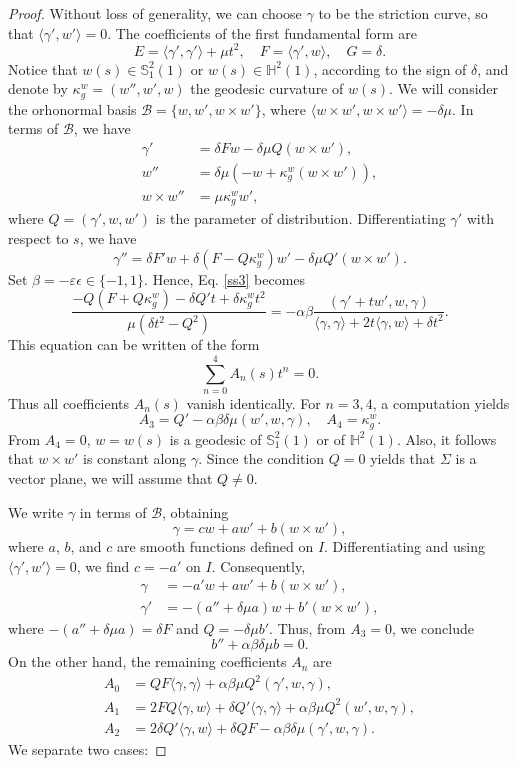 \documentclass[10pt,a4paper]{amsart}
\def\h{\mathbb H}
\def\s{\mathbb S}
\begin{document}
\begin{proof}
Without loss of generality, we can choose $\gamma$ to be the striction curve, so that $ \langle \gamma',w'\rangle=0$. The coefficients of  the first fundamental form are
$$
E=\langle \gamma',\gamma' \rangle +\mu t^2, \quad F=\langle \gamma',w\rangle, \quad G=\delta.
$$ 
Notice that $w(s)\in \s_1^2(1)$ or $w(s)\in \h^2(1)$, according to the sign of $\delta$, and denote by $\kappa_g^w=(w'',w',w)$ the geodesic curvature of $w(s)$. We will consider the orhonormal basis $\mathcal{B}=\{w,w',w\times w' \}$, where $\langle w\times w', w\times w' \rangle =-\delta \mu$. In terms of $\mathcal{B}$, we have
\begin{align*}
\gamma'&=\delta F w-\delta \mu Q (w \times w'), \\
w''&=\delta \mu (-w+\kappa_g^w(w\times w')), \\
w\times w''&=\mu \kappa_g^w w',
\end{align*}
where $Q=(\gamma',w,w')$ is the parameter of distribution. Differentiating $\gamma'$ with respect to $s$, we have
$$
\gamma''=\delta F'w +\delta (F-Q\kappa_g^w)w'-\delta \mu Q' (w\times w').
$$
Set $\beta=-\varepsilon \epsilon \in \{-1,1\}.$ Hence, Eq. \eqref{ss3} becomes
$$
\frac{-Q(F+Q\kappa_g^w)-\delta Q' t +\delta \kappa_g^wt^2}{\mu (\delta t^2-Q^2)}=-\alpha\beta\frac{(\gamma'+tw',w,\gamma)}{\langle \gamma,\gamma\rangle+2t\langle \gamma,w\rangle+\delta t^2}.
$$ 
This equation can be written  of the form $$\sum_{n=0}^4A_n(s)t^n=0.$$ 
Thus all coefficients   $A_n(s)$ vanish identically. For $n=3,4$, a computation yields 
$$
A_3=Q'-\alpha\beta\delta\mu(w',w,\gamma), \quad A_4=\kappa_g^w.
$$
From $A_4=0$,  $w=w(s)$ is a geodesic of $\s_1^2(1)$ or of $ \h^2(1)$. Also, it follows that $w\times w'$ is constant along $\gamma$. Since the condition $Q=0$ yields that $\Sigma$ is a vector plane, we will assume that $Q\neq 0$.

We write $\gamma$ in terms of $\mathcal{B}$, obtaining 
$$
\gamma=cw+aw'+b(w\times w'),
$$
where $a$, $b$, and $c$ are smooth functions defined on $I$.  Differentiating and using $\langle \gamma',w'\rangle=0$, we find $c=-a'$ on $I$. Consequently, 
\begin{align*}
\gamma&=-a'w+aw'+b(w\times w'), \\
\gamma'&=-(a''+\delta\mu a)w+b'(w\times w'),
\end{align*}
where $-(a''+\delta\mu a)=\delta F$ and $Q=-\delta\mu b'$. Thus, from $A_3=0$, we conclude
\begin{equation}
 b''+\alpha\beta\delta\mu b =0. \label{ode1}
\end{equation} 
On the other hand, the remaining coefficients $A_n$ are  
\begin{align*}
A_0&=QF\langle \gamma,\gamma \rangle +\alpha \beta \mu Q^2(\gamma',w,\gamma), \\
A_1&=2FQ\langle \gamma,w \rangle +\delta Q' \langle \gamma,\gamma \rangle+\alpha \beta \mu Q^2 (w',w,\gamma), \\
A_2&=2\delta Q'\langle \gamma,w \rangle +\delta QF-\alpha \beta \delta \mu  (\gamma',w,\gamma).
\end{align*}
We separate two cases:


\end{proof}
\end{document}
